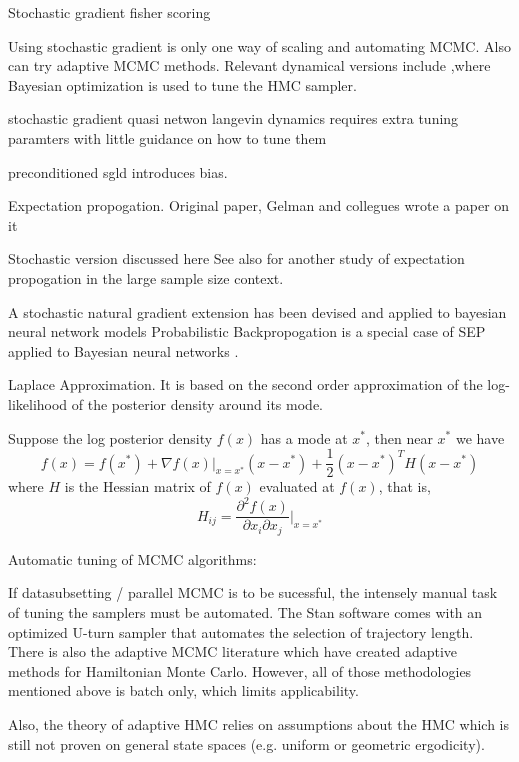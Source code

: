 \documentclass{book}
\begin{document}
\begin{enumerate}
Stochastic gradient fisher scoring \cite{ahn2012bayesian}

Using stochastic gradient is only one way of scaling and automating MCMC. Also can try adaptive MCMC methods\cite{roberts2009examples}. Relevant dynamical versions include \cite{wang2013adaptive},where Bayesian optimization \cite{mahendran2012adaptive,snoek2012practicalx,} is used to tune the HMC sampler.

stochastic gradient quasi netwon langevin dynamics requires extra tuning paramters with little guidance on how to tune them \cite{csimcsekli2016stochastic}

preconditioned sgld introduces bias\cite{li2015preconditioned}.

Expectation propogation. Original paper\cite{minka2001expectation}, Gelman and collegues wrote a paper on it \cite{gelman2014expectation}

Stochastic version discussed here \cite{li2015stochastic}
See also \cite{dehaene2015expectation} for another study of expectation propogation in the large sample size context. 

A stochastic natural gradient extension has been devised and applied to bayesian neural network models \cite{teh2015distributed}
Probabilistic Backpropogation is a special case of SEP applied to Bayesian neural networks \cite{hernandez2015probabilistic}.


Laplace Approximation. It is based on the second order approximation of the
log-likelihood of the posterior density around its mode.

Suppose the log posterior density $f(x)$ has a mode at $x^*$, then near $x^*$ we
have 
\[ f(x) = f(x^*) + \nabla f(x)|_{x=x^*} (x-x^*) + \frac{1}{2} (x-x^*)^TH(x-x^*)
\]
where $H$ is the Hessian matrix of $f(x)$ evaluated at $f(x)$, that is,
\[ H_{ij} = \frac{\partial^2 f(x)}{\partial x_i \partial x_j }|_{x=x^*} \]

Automatic tuning of MCMC algorithms:

If datasubsetting / parallel MCMC is to be sucessful, the intensely manual task
of tuning the samplers must be automated. The Stan software comes with an
optimized U-turn sampler \cite{hoffman2014no} that automates the selection of trajectory length. There is also the adaptive MCMC literature which have created adaptive methods for Hamiltonian Monte Carlo. However, all of those methodologies mentioned above is batch only, which limits applicability. 

Also, the theory of adaptive HMC relies on assumptions about the HMC which is still not proven on general state spaces (e.g. uniform or geometric ergodicity).


\end{enumerate}
\end{document}
